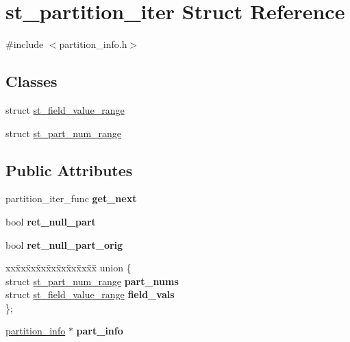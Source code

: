 \hypertarget{structst__partition__iter}{}\section{st\+\_\+partition\+\_\+iter Struct Reference}
\label{structst__partition__iter}


{\ttfamily \#include $<$partition\+\_\+info.\+h$>$}

\subsection*{Classes}
\begin{DoxyCompactItemize}
\item 
struct \mbox{\hyperlink{structst__partition__iter_1_1st__field__value__range}{st\+\_\+field\+\_\+value\+\_\+range}}
\item 
struct \mbox{\hyperlink{structst__partition__iter_1_1st__part__num__range}{st\+\_\+part\+\_\+num\+\_\+range}}
\end{DoxyCompactItemize}
\subsection*{Public Attributes}
\begin{DoxyCompactItemize}
\item 
\mbox{\label{structst__partition__iter_a600a5aa4dbcdc0def035e3a54418de59}} 
partition\+\_\+iter\+\_\+func {\bfseries get\+\_\+next}
\item 
\mbox{\label{structst__partition__iter_a2e351e9a45d9e7835106cf26b2510fef}} 
bool {\bfseries ret\+\_\+null\+\_\+part}
\item 
\mbox{\label{structst__partition__iter_a14bce9a5404ec929914e0f5ca53fca48}} 
bool {\bfseries ret\+\_\+null\+\_\+part\+\_\+orig}
\item 
\mbox{\label{structst__partition__iter_a2987f22df81d909341e83b8cc84bfb90}} 
\begin{tabbing}
xx\=xx\=xx\=xx\=xx\=xx\=xx\=xx\=xx\=\kill
union \{\\
\>struct \mbox{\hyperlink{structst__partition__iter_1_1st__part__num__range}{st\_part\_num\_range}} {\bfseries part\_nums}\\
\>struct \mbox{\hyperlink{structst__partition__iter_1_1st__field__value__range}{st\_field\_value\_range}} {\bfseries field\_vals}\\
\}; \\

\end{tabbing}\item 
\mbox{\label{structst__partition__iter_a9291e8ea7becd2a634d391aea8c63fd7}} 
\mbox{\hyperlink{classpartition__info}{partition\+\_\+info}} $\ast$ {\bfseries part\+\_\+info}
\end{DoxyCompactItemize}


